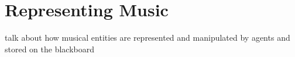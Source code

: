 \section{Representing Music}

talk about how musical entities are represented and manipulated by agents and stored on the blackboard
